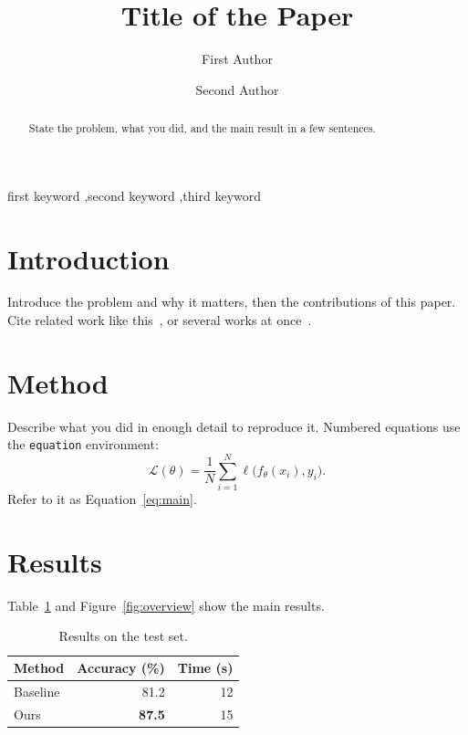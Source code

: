 \documentclass[final,5p,times,twocolumn]{elsarticle}
\begin{document}
\begin{frontmatter}

\title{Title of the Paper}

\author[inst1]{First Author}
\author[inst2]{Second Author}


\begin{abstract}
State the problem, what you did, and the main result in a few sentences.
\end{abstract}

\begin{keyword}
first keyword \sep second keyword \sep third keyword
\end{keyword}

\end{frontmatter}

\section{Introduction}
\label{sec:intro}
Introduce the problem and why it matters, then the contributions of this
paper. Cite related work like this~\cite{he2016deep}, or several works at
once~\cite{he2016deep,vaswani2017attention}.

\section{Method}
\label{sec:method}
Describe what you did in enough detail to reproduce it. Numbered equations use
the \texttt{equation} environment:
\begin{equation}
  \label{eq:main}
  \mathcal{L}(\theta) = \frac{1}{N} \sum_{i=1}^{N} \ell\bigl(f_\theta(x_i), y_i\bigr).
\end{equation}
Refer to it as Equation~\eqref{eq:main}.

\section{Results}
\label{sec:results}
Table~\ref{tab:results} and Figure~\ref{fig:overview} show the main results.

\begin{table}[htbp]
  \centering
  \caption{Results on the test set.}
  \label{tab:results}
  \begin{tabular}{lrr}
    \toprule
    Method & Accuracy (\%) & Time (s) \\
    \midrule
    Baseline & 81.2 & 12 \\
    Ours & \textbf{87.5} & 15 \\
    \bottomrule
  \end{tabular}
\end{table}
\end{document}
